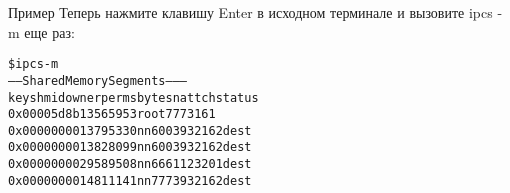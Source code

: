 \documentclass{beamer}
\begin{document}
\begin{frame}[fragile]{Пример}
Теперь нажмите клавишу Enter в исходном терминале и вызовите ipcs -m еще раз:
\begin{alltt}
\$ ipcs -m
------ Shared Memory Segments --------
key shmid owner perms bytes nattch status
0x00005d8b 13565953 root 777 316 1
0x00000000 13795330 nn 600 393216 2 dest
0x00000000 13828099 nn 600 393216 2 dest
0x00000000 29589508 nn 666 112320 1 dest
0x00000000 14811141 nn 777 393216 2 dest
\end{alltt}
\end{frame}

\end{document}

